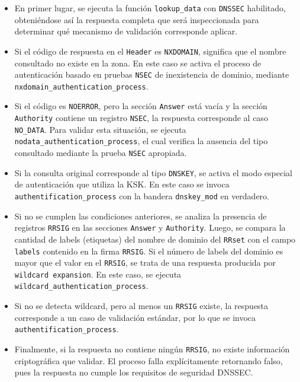 \begin{itemize}
\item En primer lugar, se ejecuta la función \texttt{lookup\_data} con \texttt{DNSSEC} habilitado, obteniéndose así la respuesta completa que será 
      inspeccionada para determinar qué mecanismo de validación corresponde aplicar.

\item Si el código de respuesta en el \texttt{Header} es \texttt{NXDOMAIN}, significa que el nombre consultado no existe en la zona.  
      En este caso se activa el proceso de autenticación basado en pruebas \texttt{NSEC} de inexistencia de dominio, mediante \texttt{nxdomain\_authentication\_process}.

\item Si el código es \texttt{NOERROR}, pero la sección \texttt{Answer} está vacía y la sección \texttt{Authority} contiene un registro \texttt{NSEC}, la respuesta corresponde al caso \texttt{NO\_DATA}.  
      Para validar esta situación, se ejecuta \texttt{nodata\_authentication\_process}, el cual verifica la ausencia del tipo consultado mediante la prueba \texttt{NSEC} apropiada.

\item Si la consulta original corresponde al tipo \texttt{DNSKEY}, se activa el modo especial de autenticación que utiliza la KSK.  
      En este caso se invoca \texttt{authentification\_process} con la bandera \texttt{dnskey\_mod} en verdadero.

\item Si no se cumplen las condiciones anteriores, se analiza la presencia de registros \texttt{RRSIG} en las secciones \texttt{Answer} y \texttt{Authority}.  
      Luego, se compara la cantidad de labels (etiquetas) del nombre de dominio del \texttt{RRset} con el campo \texttt{labels} contenido en la firma \texttt{RRSIG}.  
      Si el número de labels del dominio es mayor que el valor en el \texttt{RRSIG}, se trata de una respuesta producida por \texttt{wildcard expansion}.  
      En este caso, se ejecuta \texttt{wildcard\_authentication\_process}.

\item Si no se detecta wildcard, pero al menos un \texttt{RRSIG} existe, la respuesta corresponde a un caso de validación estándar, por lo que se invoca \texttt{authentification\_process}.

\item Finalmente, si la respuesta no contiene ningún \texttt{RRSIG}, no existe información criptográfica que validar.  
      El proceso falla explícitamente retornando falso, pues la respuesta no cumple los requisitos de seguridad DNSSEC.
\end{itemize}

